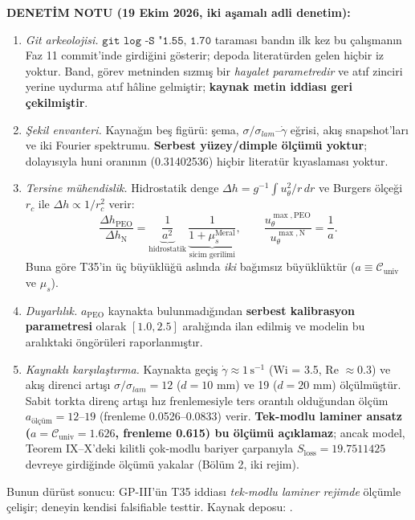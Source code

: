 \documentclass[12pt,a4paper]{article}
\begin{document}
\textbf{DENETİM NOTU (19 Ekim 2026, iki aşamalı adli denetim):}
\begin{enumerate}
    \item \textit{Git arkeolojisi.} $\texttt{git log -S "1.55, 1.70}$ taraması
    bandın ilk kez bu çalışmanın Faz 11 commit'inde girdiğini gösterir; depoda
    literatürden gelen hiçbir iz yoktur. Band, görev metninden sızmış bir
    \emph{hayalet parametredir} ve atıf zinciri yerine uydurma atıf hâline
    gelmiştir; \textbf{kaynak metin iddiası geri çekilmiştir}.
    \item \textit{Şekil envanteri.} Kaynağın beş figürü: şema,
    $\sigma/\sigma_{lam}$--$\dot\gamma$ eğrisi, akış snapshot'ları ve iki
    Fourier spektrumu. \textbf{Serbest yüzey/dimple ölçümü yoktur}; dolayısıyla
    huni oranının (0.31402536) hiçbir literatür kıyaslaması yoktur.
    \item \textit{Tersine mühendislik.} Hidrostatik denge
    $\Delta h = g^{-1}\int u_\theta^2/r\,dr$ ve Burgers ölçeği $r_c$ ile
    $\Delta h\propto 1/r_c^2$ verir:
    \begin{equation}
    \frac{\Delta h_{\mathrm{PEO}}}{\Delta h_{\mathrm{N}}}
    =\underbrace{\frac{1}{a^2}}_{\text{hidrostatik}}\,
    \underbrace{\frac{1}{1+\mu_s^{\mathrm{Meral}}}}_{\text{sicim gerilimi}},
    \qquad
    \frac{u_\theta^{\max,\mathrm{PEO}}}{u_\theta^{\max,\mathrm{N}}}=\frac{1}{a}.
    \end{equation}
    Buna göre T35'in üç büyüklüğü aslında \emph{iki} bağımsız büyüklüktür
    ($a\equiv\mathcal{C}_{\mathrm{univ}}$ ve $\mu_s$).
    \item \textit{Duyarlılık.} $a_{\mathrm{PEO}}$ kaynakta bulunmadığından
    \textbf{serbest kalibrasyon parametresi} olarak $[1.0,2.5]$ aralığında
    ilan edilmiş ve modelin bu aralıktaki öngörüleri raporlanmıştır.
    \item \textit{Kaynaklı karşılaştırma.} Kaynakta geçiş
    $\dot\gamma\approx 1\,\mathrm{s^{-1}}$ (Wi = 3.5, Re $\approx 0.3$) ve
    akış direnci artışı $\sigma/\sigma_{lam}=12$ ($d=10$ mm) ve 19
    ($d=20$ mm) ölçülmüştür. Sabit torkta direnç artışı hız frenlemesiyle
    ters orantılı olduğundan ölçüm $a_{\mathrm{ölçüm}}=12$--$19$
    (frenleme 0.0526--0.0833) verir. \textbf{Tek-modlu laminer ansatz
    ($a=\mathcal{C}_{\mathrm{univ}}=1.626$, frenleme 0.615) bu ölçümü
    açıklamaz}; ancak model, Teorem IX--X'deki kilitli çok-modlu bariyer
    çarpanıyla $S_{\mathrm{loss}}=19.7511425$ devreye girdiğinde ölçümü
    yakalar (Bölüm 2, iki rejim).
\end{enumerate}
Bunun dürüst sonucu: GP-III'ün T35 iddiası \emph{tek-modlu laminer rejimde}
ölçümle çelişir; deneyin kendisi falsifiable testtir. Kaynak deposu:
.
\end{document}
